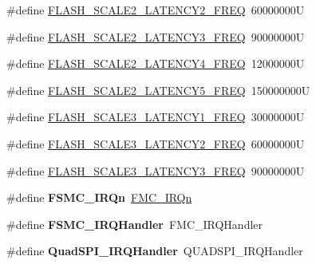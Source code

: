 \begin{DoxyCompactItemize}
\item 
\#define \mbox{\hyperlink{group___exported__macros_ga98847021d5de23ea0458b490c74e6299}{F\+L\+A\+S\+H\+\_\+\+S\+C\+A\+L\+E2\+\_\+\+L\+A\+T\+E\+N\+C\+Y2\+\_\+\+F\+R\+EQ}}~60000000U
\item 
\#define \mbox{\hyperlink{group___exported__macros_ga6956d1ea5f9484a43213022ebff8cf03}{F\+L\+A\+S\+H\+\_\+\+S\+C\+A\+L\+E2\+\_\+\+L\+A\+T\+E\+N\+C\+Y3\+\_\+\+F\+R\+EQ}}~90000000U
\item 
\#define \mbox{\hyperlink{group___exported__macros_ga8fc5a396df42d76fb41f377e71513ecb}{F\+L\+A\+S\+H\+\_\+\+S\+C\+A\+L\+E2\+\_\+\+L\+A\+T\+E\+N\+C\+Y4\+\_\+\+F\+R\+EQ}}~12000000U
\item 
\#define \mbox{\hyperlink{group___exported__macros_ga682daec68cfc17d207390b25d2e8262b}{F\+L\+A\+S\+H\+\_\+\+S\+C\+A\+L\+E2\+\_\+\+L\+A\+T\+E\+N\+C\+Y5\+\_\+\+F\+R\+EQ}}~150000000U
\item 
\#define \mbox{\hyperlink{group___exported__macros_ga322840abc74aeafafe710d45e4f9c7cd}{F\+L\+A\+S\+H\+\_\+\+S\+C\+A\+L\+E3\+\_\+\+L\+A\+T\+E\+N\+C\+Y1\+\_\+\+F\+R\+EQ}}~30000000U
\item 
\#define \mbox{\hyperlink{group___exported__macros_ga9a6fd257610db9111ae2a291825a86d0}{F\+L\+A\+S\+H\+\_\+\+S\+C\+A\+L\+E3\+\_\+\+L\+A\+T\+E\+N\+C\+Y2\+\_\+\+F\+R\+EQ}}~60000000U
\item 
\#define \mbox{\hyperlink{group___exported__macros_ga830d9e447fdbca14d2e0a3f0ecaa2e93}{F\+L\+A\+S\+H\+\_\+\+S\+C\+A\+L\+E3\+\_\+\+L\+A\+T\+E\+N\+C\+Y3\+\_\+\+F\+R\+EQ}}~90000000U
\item 
\mbox{\label{group___exported__macros_ga1e962a05aa13410750964a6ddd58e5cf}} 
\#define {\bfseries F\+S\+M\+C\+\_\+\+I\+R\+Qn}~\mbox{\hyperlink{group___peripheral__interrupt__number__definition_gga7e1129cd8a196f4284d41db3e82ad5c8ab58dc79a081058857f73965f5305479b}{F\+M\+C\+\_\+\+I\+R\+Qn}}
\item 
\mbox{\label{group___exported__macros_ga5b49d338a67aae8ff880596f373a1d58}} 
\#define {\bfseries F\+S\+M\+C\+\_\+\+I\+R\+Q\+Handler}~F\+M\+C\+\_\+\+I\+R\+Q\+Handler
\item 
\mbox{\label{group___exported__macros_ga700576eb2ce12f5592b91f25ba4fb35a}} 
\#define {\bfseries Quad\+S\+P\+I\+\_\+\+I\+R\+Q\+Handler}~Q\+U\+A\+D\+S\+P\+I\+\_\+\+I\+R\+Q\+Handler
\end{DoxyCompactItemize}


